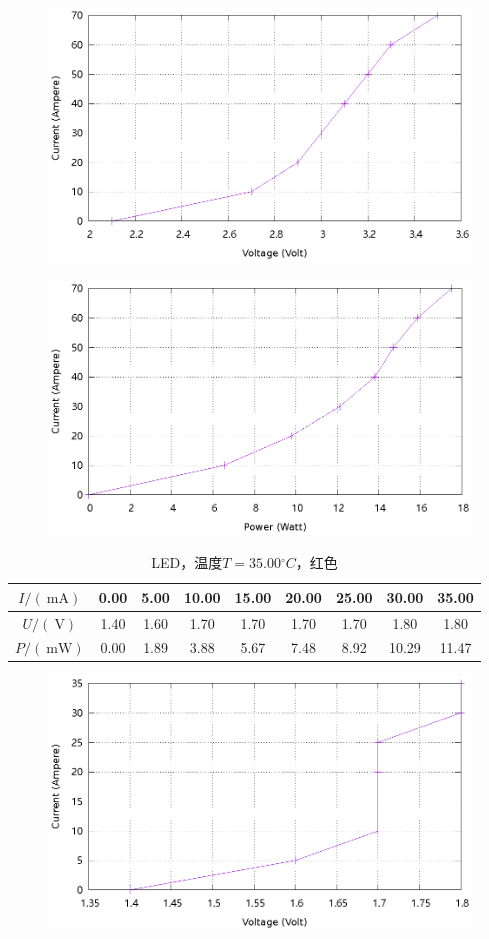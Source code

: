 \documentclass{ctexart}
\newcommand{\si}[1]{\  \mathrm{#1}}
\begin{document}
\begin{figure}[H]
    \centering
    \includegraphics[width=0.9\linewidth]{../output/led-vc-4.gnuplot}
\end{figure}
\begin{figure}[H]
    \centering
    \includegraphics[width=0.9\linewidth]{../output/led-pc-4.gnuplot}
\end{figure}
\newpage
\begin{table}[H]
    \centering
    \begin{tabular}{|c|c|c|c|c|c|c|c|c|}
        \hline
        $I/(\si{mA})$   & 0.00 & 5.00 & 10.00 & 15.00 & 20.00 & 25.00 & 30.00 & 35.00 \\\hline
        $U / (\si{V})$  & 1.40 & 1.60 & 1.70 & 1.70 & 1.70 & 1.70 & 1.80 & 1.80 \\\hline
        $P / (\si{mW})$ & 0.00 & 1.89 & 3.88 & 5.67 & 7.48 & 8.92 & 10.29 & 11.47 \\\hline
    \end{tabular}
    \caption{LED，温度$T=35.00{}^{\circ}C$，红色}
\end{table}
\begin{figure}[H]
    \centering
    \includegraphics[width=0.9\linewidth]{../output/led-vc-5.gnuplot}
\end{figure}
\end{document}
